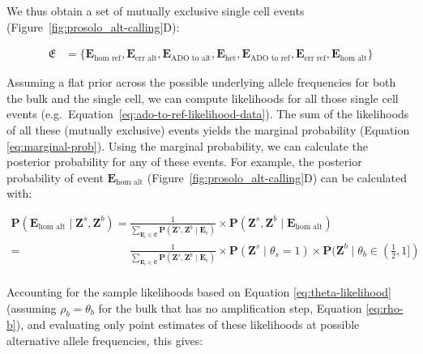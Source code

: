 \documentclass[12pt,inline]{wlscirep}
\newcommand{\Prob}{{\mathbf{P}}}
\begin{document}
We thus obtain a set of mutually exclusive single cell events (Figure~\ref{fig:prosolo_alt-calling}D):

\begin{equation}
  \label{eq:event-set}
  \begin{split}
    \mathfrak{E} &= \{ \boldsymbol{E}_{\text{hom ref}}, \boldsymbol{E}_{\text{err alt}}, \boldsymbol{E}_{\text{ADO to alt}}, \boldsymbol{E}_{\text{het}}, \boldsymbol{E}_{\text{ADO to ref}}, \boldsymbol{E}_{\text{err ref}}, \boldsymbol{E}_{\text{hom alt}} \}
  \end{split}
\end{equation}

Assuming a flat prior across the possible underlying allele frequencies for both the bulk and the single cell, we can compute likelihoods for all those single cell events (e.g.~Equation~\ref{eq:ado-to-ref-likelihood-data}).
The sum of the likelihoods of all these (mutually exclusive) events yields the marginal probability (Equation \ref{eq:marginal-prob}).
Using the marginal probability, we can calculate the posterior probability for any of these events.
For example, the posterior probability of event $\boldsymbol{E}_{\text{hom alt}}$ (Figure~\ref{fig:prosolo_alt-calling}D) can be calculated with:

\begin{equation}
 \label{eq:hom-alt-posterior-samples}
 \begin{split}
  \Prob(\boldsymbol{E}_{\text{hom alt}} \mid \boldsymbol{Z}^s,\boldsymbol{Z}^b)
    =~&\frac{1}{\sum_{\boldsymbol{E}_e \in \mathfrak{E}}{\Prob(\boldsymbol{Z}^s,\boldsymbol{Z}^b \mid \boldsymbol{E}_e )}} \times
      \Prob(\boldsymbol{Z}^s,\boldsymbol{Z}^b \mid \boldsymbol{E}_{\text{hom alt}}) \\
    =~&\frac{1}{\sum_{\boldsymbol{E}_e \in \mathfrak{E}}{\Prob(\boldsymbol{Z}^s,\boldsymbol{Z}^b \mid \boldsymbol{E}_e )}} \times
      \Prob(\boldsymbol{Z}^s \mid \theta_s = 1) \times \Prob(\boldsymbol{Z}^b \mid \theta_b \in (\frac12,1])\\
  \end{split}    
\end{equation}

Accounting for the sample likelihoods based on Equation \ref{eq:theta-likelihood} (assuming $\rho_b = \theta_b$ for the bulk that has no amplification step, Equation \ref{eq:rho-b}), and evaluating only point estimates of these likelihoods at possible alternative allele frequencies, this gives:
\end{document}
